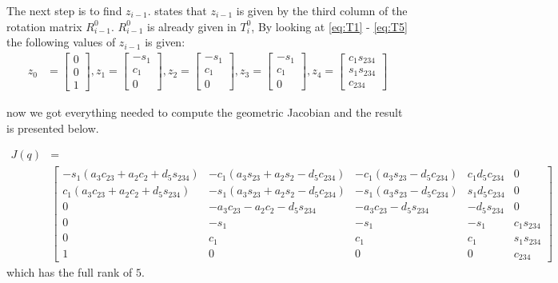 The next step is to find $z_{i-1}$. \cite{Siciliano} states that $z_{i-1}$ is given by the third column of the rotation matrix $R_{i-1}^0$. $R_{i-1}^0$ is already given in $T_i^0$, By looking at \eqref{eq:T1} - \eqref{eq:T5} the following values of $z_{i-1}$ is given:
\begin{align*}
    z_0 &= \begin{bmatrix}0\\0\\1\end{bmatrix},
    z_1 = \begin{bmatrix}-s_1\\c_1\\0\end{bmatrix},
    z_2 = \begin{bmatrix}-s_1\\c_1\\0\end{bmatrix},
    z_3 = \begin{bmatrix}-s_1\\c_1\\0\end{bmatrix},
    z_4 = \begin{bmatrix}c_1s_{234}\\s_1s_{234}\\c_{234}\end{bmatrix}
\end{align*}

now we got everything needed to compute the geometric Jacobian and the result is presented below.


\begin{align*}
    J(q) &= \\
    &\begin{bmatrix}
        -s_1(a_3c_{23} + a_2c_{2} + d_5s_{234}) & 
        -c_1(a_3s_{23} + a_2s_{2} - d_5c_{234}) & 
        -c_1(a_3s_{23} - d_5c_{234})            & 
        c_1d_5c_{234}                           & 
        0\\
        c_1(a_3c_{23} + a_2c_{2} + d_5s_{234})  & 
        -s_1(a_3s_{23} + a_2s_{2} - d_5c_{234}) & 
        -s_1(a_3s_{23} - d_5c_{234})            & 
        s_1d_5c_{234}                           & 
        0\\
        0                                       &
        -a_3c_{23}- a_2c_2 - d_5s_{234}         &
        -a_3c_{23} - d_5s_{234}                 &
        -d_5s_{234}                             &
        0\\
        0                                       &
        -s_1                                    &
        -s_1                                    &
        -s_1                                    &
        c_1s_{234}\\
        0                                       &
        c_1&
        c_1&
        c_1&
        s_1s_{234}\\
        1& 0 & 0 & 0 & c_{234}
    \end{bmatrix}
\end{align*}
which has the full rank of $5$. 


